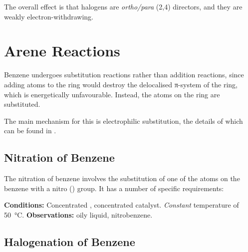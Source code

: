 				The overall effect is that halogens are \textit{ortho/para} (2,4) directors, and they are weakly electron-withdrawing.





	\pagebreak
	\hypertarget{AreneReactions}{}
	\section{Arene Reactions}

		Benzene undergoes substitution reactions rather than addition reactions, since adding atoms to the ring would destroy the
		delocalised π-system of the ring, which is energetically unfavourable. Instead, the  atoms on the ring are substituted.

		The main mechanism for this is electrophilic substitution, the details of which can be found in
		\hyperlink{AppendixElectrophilicSubstitution}{}.


		\subsection{Nitration of Benzene}

			The nitration of benzene involves the substitution of one of the  atoms on the benzene with a nitro () group.
			It has a number of specific requirements:

			\vspace{1.5em}
			\vbox{\textbf{Conditions:}	\tabto{35mm}Concentrated , concentrated  catalyst.
										\tabto{35mm}\textit{Constant} temperature of \SI{50}{\celsius}.}
			\vspace{0.75em}
			\vbox{\textbf{Observations:}\tabto{35mm} oily liquid, nitrobenzene.}



		\pagebreak
		\subsection{Halogenation of Benzene}

